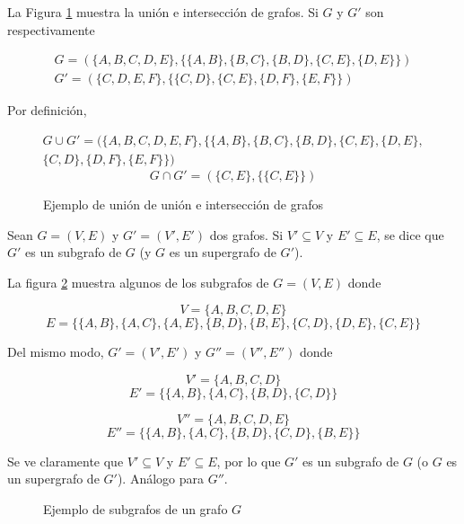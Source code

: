 \begin{ejemplo}
La Figura \ref{fig:union_interseccion_grafo} muestra la unión e intersección de grafos. Si $G$ y $G'$ son respectivamente 

\begin{eqnarray*}
G = (\{A, B, C, D, E\}, \{ \{A,B\}, \{B,C\}, \{B,D\}, \{C,E\}, \{D, E\} \})\\
G' = (\{C, D, E, F\}, \{ \{C,D\}, \{C,E\}, \{D,F\}, \{E,F\} \})
\end{eqnarray*}

Por definición,

\begin{multline*}
G \cup G' = (\{A, B, C, D, E, F\}, \{ \{A,B\}, \{B,C\}, \{B,D\}, \{C,E\}, \{D, E\}, \\
\{C,D\}, \{D,F\},\{E,F\} \})
\end{multline*}
\[G \cap G' = (\{C, E\}, \{\{C,E\}\})\]


\begin{figure}[htb]
\centering
\ejemplounionintersecciongrafo
\caption{Ejemplo de unión de unión e intersección de grafos}
\label{fig:union_interseccion_grafo}
\end{figure}

\end{ejemplo}

\begin{defi}

Sean $G = (V,E)$ y $G' = (V',E')$ dos grafos. Si $V' \subseteq V$ y $E' \subseteq E$, se dice que $G'$ es un subgrafo de $G$ (y $G$ es un supergrafo de $G'$).

\end{defi}

\begin{ejemplo}
La figura \ref*{fig:subgrafo} muestra algunos de los subgrafos de $G= (V,E)$ donde

\[ V  = \{A, B, C, D, E\}\]
\[E = \{ \{A,B\}, \{A,C\}, \{A,E\}, \{B,D\}, \{B, E\},\{C,D\}, \{D,E\},\{C,E\} \} \]

Del mismo modo, $G' = (V', E')$ y $G'' = (V'', E'')$ donde

\[ V'  = \{A, B, C, D\}\]
\[E' = \{ \{A,B\}, \{A,C\}, \{B,D\},\{C,D\} \} \]

\[ V''  = \{A, B, C, D, E\}\]
\[E'' = \{ \{A,B\}, \{A,C\}, \{B,D\},\{C,D\},\{B,E\} \} \]

Se ve claramente que $V' \subseteq V$ y $E' \subseteq E$, por lo que $G'$ es un subgrafo de $G$ (o $G$ es un supergrafo de $G'$). Análogo para $G''$.


\begin{figure}[htb]
\centering
\ejemplosubgrafo
\caption[Ejemplo de subgrafos de un grafo]{Ejemplo de subgrafos de un grafo $G$}
\label{fig:subgrafo}
\end{figure}

\end{ejemplo}

